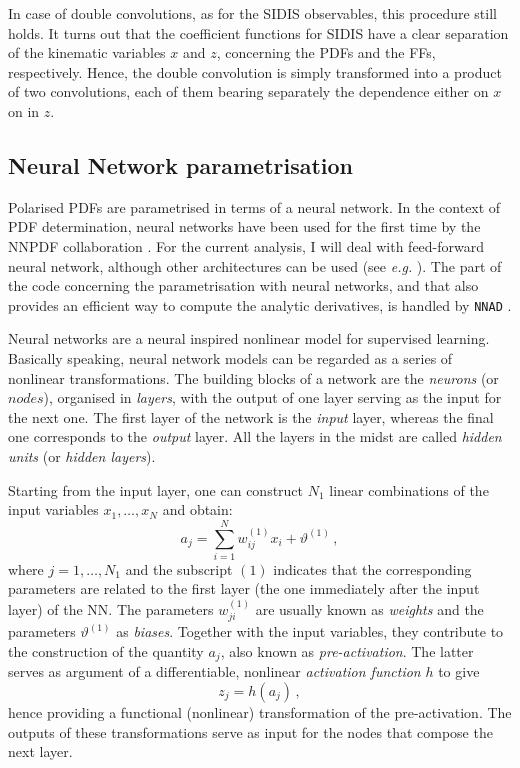 In case of double convolutions, as for the SIDIS observables, this procedure still holds. It turns out that the coefficient functions for SIDIS have a clear separation of the kinematic variables $x$ and $z$, concerning the PDFs and the FFs, respectively. Hence, the double convolution is simply transformed into a product of two convolutions, each of them bearing separately the dependence either on $x$ on in $z$. 


\subsection{Neural Network parametrisation}
\label{sec:NN}

Polarised PDFs are parametrised in terms of a neural network. In the context of PDF determination, neural networks have been used for the first time by the NNPDF collaboration \cite{Forte:2002fg}. For the current analysis, I will deal with feed-forward neural network, although other architectures can be used (see \textit{e.g.} \cite{Bishop}). The part of the code concerning the parametrisation with neural networks, and that also provides an efficient way to compute the analytic derivatives, is handled by \texttt{NNAD} \cite*{AbdulKhalek:2020uza}.%

Neural networks are a neural inspired nonlinear model for supervised learning. Basically speaking, neural network models can be regarded as a series of nonlinear transformations. The building blocks of a network are the \textit{neurons} (or $\textit{nodes}$), organised in \textit{layers}, with the output of one layer serving as the input for the next one. The first layer of the network is the \textit{input} layer, whereas the final one corresponds to the \textit{output} layer. All the layers in the midst are called \textit{hidden units} (or \textit{hidden layers}).\par
Starting from the input layer, one can construct $N_1$ linear combinations of the input variables $x_1, \dots, x_N$ and obtain:
\begin{equation}
  a_j = \sum_{i=1}^{N} w_{ij}^{(1)} x_i + \vartheta^{(1)}\,,
  \label{eq:activation}
\end{equation}
where $j=1,\dots,N_1$ and the subscript $(1)$ indicates that the corresponding parameters are related to the first layer (the one immediately after the input layer) of the NN. The parameters $w^{(1)}_{ji}$ are usually known as \textit{weights} and the parameters $\vartheta^{(1)}$ as \textit{biases}. Together with the input variables, they contribute to the construction of the quantity $a_j$, also known as \textit{pre-activation}. The latter serves as argument of a differentiable, nonlinear \textit{activation function} $h$ to give
\begin{equation}
  z_{j} = h(a_j)\,,
\end{equation}
hence providing a functional (nonlinear) transformation of the pre-activation. The outputs of these transformations serve as input for the nodes that compose the next layer.%

